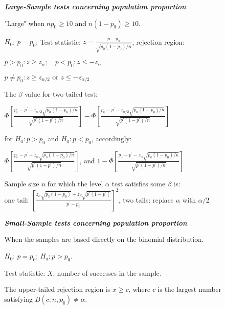 \documentclass{article}
\newcommand{\smalltitle}[1]{
	\noindent
	\textbf{\textit{#1}}
}
\begin{document}
	
	\smalltitle{Large-Sample tests concerning population proportion}
	
	"Large" when $np_0 \geq 10$ and $n(1-p_0)\geq 10$.
	
	$H_0$: $p=p_0$; Test statistic: $z = \frac { \hat { p } - p _ { 0 } } { \sqrt { p _ { 0 } \left( 1 - p _ { 0 } \right) / n } }$, rejection region:
	
	$
	{ p > p _ { 0 } } : z \geq z_\alpha ;\quad
	{ p < p _ { 0 } } : z \leq -z_\alpha 
	$
	
	$
	{ p \neq p _ { 0 } } : z \geq z_{\alpha/2} \text{ or } z\leq-z_{\alpha/2}
	$
	
	The $\beta$ value for two-tailed test:
	
	$\Phi \left[ \frac { p _ { 0 } - p ^ { \prime } + z _ { \alpha / 2 } \sqrt { p _ { 0 } \left( 1 - p _ { 0 } \right) / n } } { \sqrt { p ^ { \prime } \left( 1 - p ^ { \prime } \right) / n } } \right] - \Phi \left[ \frac { p _ { 0 } - p ^ { \prime } - z _ { \alpha / 2 } \sqrt { p _ { 0 } \left( 1 - p _ { 0 } \right) / n } } { \sqrt { p ^ { \prime } \left( 1 - p ^ { \prime } \right) / n } } \right]$
	
	for $H_a: p>p_0$ and $H_a: p < p_0$, accordingly:
	
	$\Phi \left[ \frac { p _ { 0 } - p ^ { \prime } + z _ { \alpha } \sqrt { p _ { 0 } \left( 1 - p _ { 0 } \right) / n } } { \sqrt { p ^ { \prime } \left( 1 - p ^ { \prime } \right) / n } } \right]$, and $1 - \Phi \left[ \frac { p _ { 0 } - p ^ { \prime } - z _ { \alpha } \sqrt { p _ { 0 } \left( 1 - p _ { 0 } \right) / n } } { \sqrt { p ^ { \prime } \left( 1 - p ^ { \prime } \right) / n } } \right]$
	
	Sample size $n$ for which the level $\alpha$ test satisfies some $\beta$ is:
	\\
	one tail: $\left[ \frac { z _ { \alpha } \sqrt { p _ { 0 } \left( 1 - p _ { 0 } \right) } + z _ { \beta } \sqrt { p ^ { \prime } \left( 1 - p ^ { \prime } \right) } } { p ^ { \prime } - p _ { 0 } } \right] ^ { 2 }$, two tails: replace $\alpha$ with $\alpha/2$
	
	\smalltitle{Small-Sample tests concerning population proportion}
	
	When the samples are based directly on the binomial distribution.
	
	$H_0$: $p=p_0$; $H_a: p>p_0$.
	
	Test statistic: $X$, number of successes in the sample.
	
	The upper-tailed rejection region is $x\geq c$, where $c$ is the largest number satisfying $B(c;n,p_0)\neq \alpha$.
	
\end{document}
